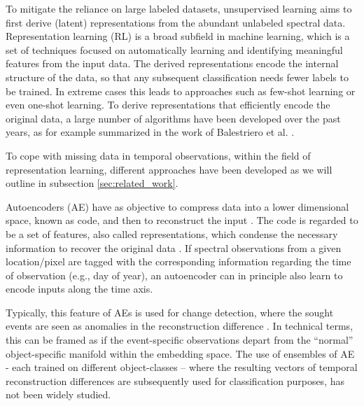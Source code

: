 \documentclass[journal,article,submit,pdftex,moreauthors]{Definitions/mdpi}
\begin{document}
To mitigate the reliance on large labeled datasets, unsupervised learning aims to first derive (latent) representations from the abundant unlabeled spectral data. Representation learning (RL) is a broad subfield in machine learning, which is a set of techniques focused on automatically learning and identifying meaningful features from the input data. The derived representations encode the internal structure of the data, so that any subsequent classification needs fewer labels to be trained. In extreme cases this leads to approaches such as few-shot learning or even one-shot learning. To derive representations that efficiently encode the original data, a large number of algorithms have been developed over the past years, as for example summarized in the work of Balestriero et al. \cite{Balestriero2023}.

To cope with missing data in temporal observations, within the field of representation learning, different approaches have been developed as we will outline in subsection \ref{sec:related_work}.

Autoencoders (AE) have as objective to compress data into a lower dimensional space, known as code, and then to reconstruct the input \cite{ML2023}. The code is regarded to be a set of features, also called representations, which condense the necessary information to recover the original data \cite{LopezPinaya2020}. 
If spectral observations from a given location/pixel are tagged with the corresponding information regarding the time of observation (e.g., day of year), an autoencoder can in principle also learn to encode inputs along the time axis. 

Typically, this feature of AEs is used for change detection, where the sought events are seen as anomalies in the reconstruction difference \cite{LopezFandino2018,Luppino2024,Kalinicheva2019}. In technical terms, this can be framed as if the event-specific observations depart from the “normal” object-specific manifold within the embedding space. The use of ensembles of AE - each trained on different object-classes – where the resulting vectors of temporal reconstruction differences are subsequently used for classification purposes, has not been widely studied.

\end{document}
